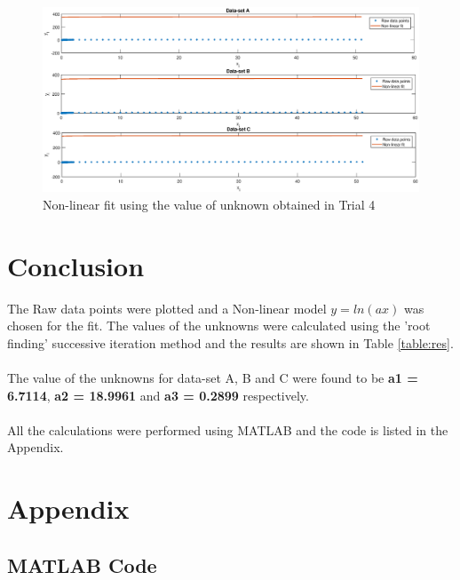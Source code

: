 \documentclass{article}
\begin{document}
\begin{figure}
\centering
	\includegraphics[width=\textwidth]{Trial4.eps}
	\caption{Non-linear fit using the value of unknown obtained in Trial 4}
	\label{fig:t4}
\end{figure}
\newpage
\section{Conclusion}
The Raw data points were plotted and a Non-linear model $y=ln(ax)$ was chosen for the fit. The values of the unknowns were calculated using the 'root finding' successive iteration method and the results are shown in Table \ref{table:res}. \\
\\
The value of the unknowns  for data-set A, B and C were found to be  \textbf{a1 = 6.7114}, \textbf{a2 = 18.9961} and \textbf{a3 = 0.2899} respectively. \\
\\
All the calculations were performed using MATLAB and the code is listed in the Appendix.

\newpage



\section{Appendix}

\subsection{MATLAB Code}


\end{document}
